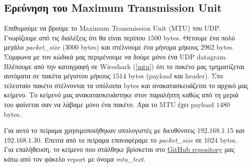 \documentclass{article}
\begin{document}
\subsection{Ερεύνηση του Maximum Transmission Unit}
Επιθυμούμε να βρούμε το Maximum Transmission Unit (MTU) του UDP. Γνωρίζουμε από τις διαλέξεις ότι θα είναι
περίπου $1500$ bytes. Θέτουμε ένα πολύ μεγάλο \textit{packet\_size} ($3000$ bytes) και στέλνουμε ένα μήνυμα 
μήκους $2962$ bytes. Σύμφωνα με τον κώδικά μας περιμένουμε να δούμε μόνο ένα UDP datagram.
Βλέπουμε από την καταγραφή σε Wireshark (\ref{mtu}) ότι το πακέτο μας τμηματίζεται αυτόματα σε πακέτα μέγιστου μήκους 
$1514$ bytes (payload και header). Στο τελευταίο πακέτο στέλνονται τα υπόλοιπα bytes και ανακατασκευάζεται το αρχικό μας κείμενο. 
Το κείμενό μας ανακατασκευάστηκε στον παραλήπτη καθώς από τη μεριά του φαίνεται σαν 
να λάβαμε μόνο ένα πακέτο. Άρα το MTU έχει payload $1480$ bytes.

Για αυτό το πείραμα χρησιμοποιήθηκαν υπολογιστές με διευθύνσεις $192.168.1.15$ και $192.168.1.30$. Έπειτα από
το πείραμα επαναφέραμε το \textit{packet\_size} σε $1024$ bytes. Για επαλήθευση, το κείμενο που στάλθηκε βρίσκεται
στο \href{https://github.com/PacoPacorius/diktya-II-ergasia}{GitHub repository} μας κάτω από τον φάκελο report
με όνομα \textit{mtu\_text}.
\end{document}
